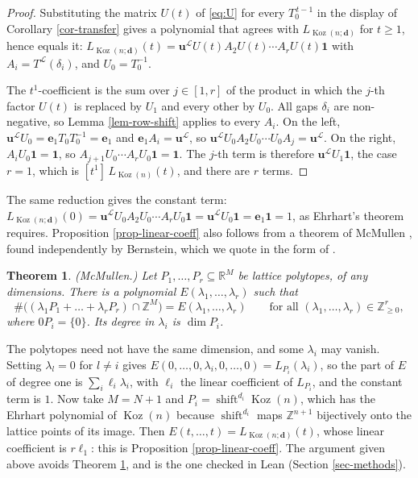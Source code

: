 \documentclass[11pt, a4paper, abstract=yes]{scrartcl}
\theoremstyle{definition}
\theoremstyle{remark}
\theoremstyle{plain}
\newtheorem{theorem}[definition]{Theorem}
\newcommand{\vek}[1]{\boldsymbol{#1}}
\theoremstyle{remark}
\theoremstyle{plain}
\newcommand{\Koz}{\operatorname{Koz}}
\newcommand{\shift}{\operatorname{shift}}
\begin{document}
\begin{proof}
Substituting the matrix \(U(t)\) of \eqref{eq:U} for every \(T_0^{\,t-1}\) in the
display of Corollary \ref{cor-transfer} gives a polynomial that agrees with \(L_{\Koz(n;\vek d)}\) for
\(t\ge1\), hence equals it:
\(L_{\Koz(n;\vek d)}(t)=\vek u^{\mathcal L}U(t)A_2U(t)\cdots A_rU(t)\vek 1\) with
\(A_i=T^{\mathcal L}(\delta_i)\), and \(U_0=T_0^{-1}\).

The \(t^1\)-coefficient is the sum over \(j\in[1,r]\) of the product in which the \(j\)-th factor
\(U(t)\) is replaced by \(U_1\) and every other by \(U_0\). All gaps \(\delta_i\) are non-negative,
so Lemma \ref{lem-row-shift} applies to every \(A_i\). On the left,
\(\vek u^{\mathcal L}U_0=\vek e_1T_0T_0^{-1}=\vek e_1\) and \(\vek e_1A_i=\vek u^{\mathcal L}\), so
\(\vek u^{\mathcal L}U_0A_2U_0\cdots U_0A_j=\vek u^{\mathcal L}\). On the right, \(A_iU_0\vek 1=\vek 1\),
so \(A_{j+1}U_0\cdots A_rU_0\vek 1=\vek 1\). The \(j\)-th term is therefore
\(\vek u^{\mathcal L}U_1\vek 1\), the case \(r=1\), which is \([t^1]\,L_{\Koz(n)}(t)\), and there are
\(r\) terms.
\end{proof}

The same reduction gives the constant term:
\(L_{\Koz(n;\vek d)}(0)=\vek u^{\mathcal L}U_0A_2U_0\cdots A_rU_0\vek 1=\vek u^{\mathcal L}U_0\vek 1=\vek e_1\vek 1=1\),
as Ehrhart's theorem requires. Proposition \ref{prop-linear-coeff} also follows from a theorem of
McMullen \autocite{McMullen1977}, found independently by Bernstein, which we quote in the form of
\autocite[Theorem 2.3]{HaaseJuhnkeSanyalTheobald2017}.

\begin{theorem}
(\emph{McMullen}.) Let \(P_1,\dots,P_r\subseteq\mathbb R^M\) be lattice polytopes, of any dimensions. There is
a polynomial \(E(\lambda_1,\dots,\lambda_r)\) such that
\[
  \#\bigl((\lambda_1P_1+\dots+\lambda_rP_r)\cap\mathbb Z^M\bigr)=E(\lambda_1,\dots,\lambda_r)
  \qquad\text{for all }(\lambda_1,\dots,\lambda_r)\in\mathbb Z_{\ge0}^r,
\]
where \(0P_i=\lbrace0\rbrace\). Its degree in \(\lambda_i\) is \(\dim P_i\).
\label{thm-mcmullen}
\end{theorem}

The polytopes need not have the same dimension, and some \(\lambda_i\) may vanish. Setting
\(\lambda_l=0\) for \(l\ne i\) gives \(E(0,\dots,0,\lambda_i,0,\dots,0)=L_{P_i}(\lambda_i)\), so the part of
\(E\) of degree one is \(\sum_i\ell_i\lambda_i\), with \(\ell_i\) the linear coefficient of \(L_{P_i}\),
and the constant term is \(1\). Now take \(M=N+1\) and \(P_i=\shift^{d_i}\Koz(n)\), which has the
Ehrhart polynomial of \(\Koz(n)\) because \(\shift^{d_i}\) maps \(\mathbb Z^{n+1}\) bijectively onto the
lattice points of its image. Then \(E(t,\dots,t)=L_{\Koz(n;\vek d)}(t)\), whose linear coefficient is
\(r\ell_1\): this is Proposition \ref{prop-linear-coeff}. The argument given above avoids
Theorem \ref{thm-mcmullen}, and is the one checked in Lean (Section \ref{sec-methods}).
\end{document}
